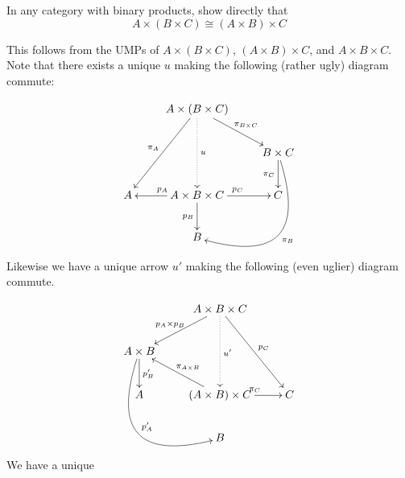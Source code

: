 \setcounter{booksection}{2}
\showsolutionstrue
\begin{BookProblem}{13}
  In any category with binary products, show directly that \[A \times (B \times
  C) \cong (A \times B) \times C \]

  \begin{Solution}
    This follows from the UMPs of \(A\times (B \times C)\), \((A \times B)\times
    C\), and \(A \times B \times C\). Note that there exists a unique \(u\)
    making the following (rather ugly) diagram commute:


    \begin{equation}
      \def\piA{\ar[ddl]_{\pi_A}}
      \def\piBC{\ar[dr]^{\pi_{B\times C}}}
      \def\piB{\ar@/^4.2pc/[ddl]^{\pi_B}}
      \def\piC{\ar[d]_{\pi_C}}
      \def\pA{\ar[l]_{p_A}}
      \def\pB{\ar[d]_{p_B}}
      \def\pC{\ar[r]^{p_C}}
      \def\ps{\pA\pB\pC}
      \def\induced{\ar@{..>}[dd]^u}
      \xymatrix{%
        & A \times (B \times C)\piA\piBC\induced &  \\
          &                                & B \times C\piB\piC\\
        A & A \times B \times C\ps         & C \\
          &          B                     &
      }
    \end{equation}

    Likewise we have a unique arrow \(u'\) making the following (even uglier)
    diagram commute.

    \begin{equation}
      \def\pC{\ar[ddr]^{p_C}}
      \def\pAB{\ar[dl]_{p_A \times p_B}}
      \def\ppA{\ar@/_4.2pc/[ddr]^{p'_A}}
      \def\ppB{\ar[d]^{p'_B}}
      \def\piAB{\ar[ul]_{\pi_{A\times B}}}
      \def\piC{\ar[r]^{\pi_C}}
      \def\pis{\piAB\piC}
      \def\induced{\ar@{..>}[dd]^{u'}}
      \xymatrix{%
                            & A \times B \times C\pAB\pC\induced     &  \\
        A \times B \ppA\ppB &                                & \\
        A                   & (A \times B) \times C\pis      & C \\
                            &          B                     &
      }
    \end{equation}

    We have a unique
  \end{Solution}
\end{BookProblem}

